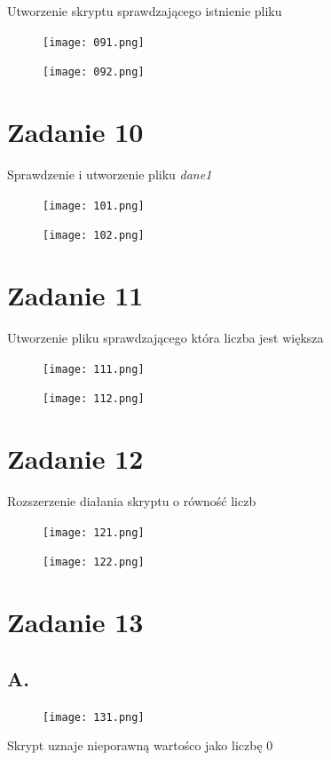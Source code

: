 \documentclass[fleqn,onecolumn,a4paper,12pt,titlepage]{article}
\begin{document}
Utworzenie skryptu sprawdzającego istnienie pliku
\begin{figure}[H]%
    \centering\texttt{[image: 091.png]}
\end{figure}
\begin{figure}[H]%
    \centering\texttt{[image: 092.png]}
\end{figure}

\section*{Zadanie 10}

Sprawdzenie i utworzenie pliku \textit{dane1}
\begin{figure}[H]%
    \centering\texttt{[image: 101.png]}
\end{figure}
\begin{figure}[H]%
    \centering\texttt{[image: 102.png]}
\end{figure}

\section*{Zadanie 11}

Utworzenie pliku sprawdzającego która liczba jest większa
\begin{figure}[H]%
    \centering\texttt{[image: 111.png]}
\end{figure}
\begin{figure}[H]%
    \centering\texttt{[image: 112.png]}
\end{figure}

\section*{Zadanie 12}

Rozszerzenie diałania skryptu o równość liczb
\begin{figure}[H]%
    \centering\texttt{[image: 121.png]}
\end{figure}
\begin{figure}[H]%
    \centering\texttt{[image: 122.png]}
\end{figure}

\section*{Zadanie 13}
\subsection*{A. } 
\begin{figure}[H]%
    \centering\texttt{[image: 131.png]}
\end{figure}
Skrypt uznaje nieporawną wartośco jako liczbę 0
\end{document}
